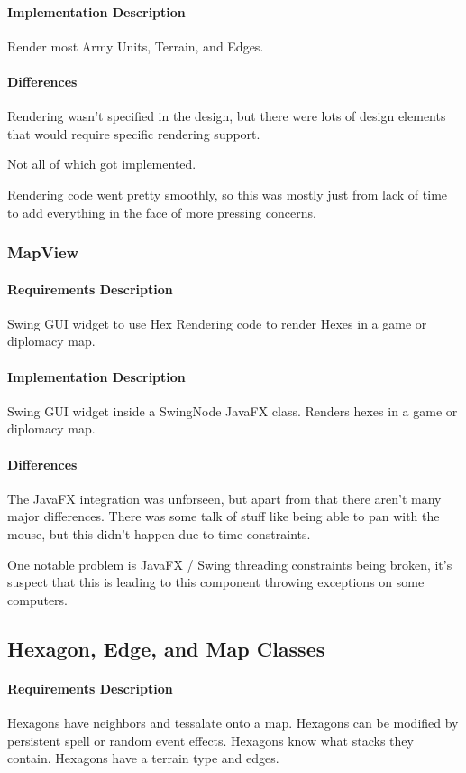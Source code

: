 \documentclass[12pt,a4paper,titlepage]{article}
\begin{document}
\paragraph{Implementation Description}
Render most Army Units, Terrain, and Edges.

\paragraph{Differences}
Rendering wasn't specified in the design, but there were lots of 
design elements that would require specific rendering support.

Not all of which got implemented.

Rendering code went pretty smoothly, so this was
mostly just from lack of time to add everything in the face of
more pressing concerns.

\subsubsection{MapView}
\paragraph{Requirements Description} 
Swing GUI widget to use Hex Rendering code to render Hexes in a game or diplomacy map.
\paragraph{Implementation Description}
Swing GUI widget inside a SwingNode JavaFX class. Renders hexes in a game or diplomacy map.
\paragraph{Differences}
The JavaFX integration was unforseen, but apart from that there aren't many major differences.
There was some talk of stuff like being able to pan with the mouse, but this didn't happen
due to time constraints.

One notable problem is JavaFX / Swing threading constraints being broken,
it's suspect that this is leading to this component throwing exceptions
on some computers.


\subsection{Hexagon, Edge, and Map Classes} 
\paragraph{Requirements Description}
Hexagons have neighbors and tessalate onto a map.
Hexagons can be modified by persistent spell or
random event effects.
Hexagons know what stacks they contain.
Hexagons have a terrain type and edges.
\end{document}
